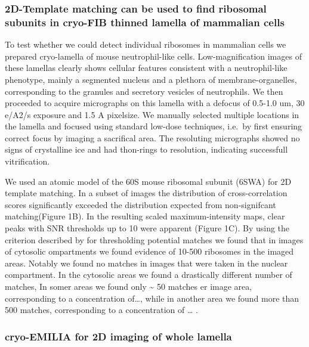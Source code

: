 \documentclass[
]{article}
\begin{document}
\hypertarget{d-template-matching-can-be-used-to-find-ribosomal-subunits-in-cryo-fib-thinned-lamella-of-mammalian-cells}{%
\subsubsection{2D-Template matching can be used to find ribosomal subunits in cryo-FIB thinned lamella of mammalian cells}\label{d-template-matching-can-be-used-to-find-ribosomal-subunits-in-cryo-fib-thinned-lamella-of-mammalian-cells}}

To test whether we could detect individual ribosomes in mammalian cells we
prepared cryo-lamella of mouse neutrophil-like cells. Low-magnification images
of these lamellas clearly shows cellular features consistent with a
neutrophil-like phenotype, mainly a segmented nucleus and a plethora of
membrane-organelles, corresponding to the granules and secretory vesicles of
neutrophils. We then proceeded to acquire micrographs on this lamella with a
defocus of 0.5-1.0 um, 30 e/A2/s exposure and 1.5 A pixelsize. We manually
selected multiple locations in the lamella and focused using standard low-dose
techniques, i.e.~by first ensuring correct focus by imaging a sacrifical area.
The resoluting micrographs showed no signs of crystalline ice and had thon-rings
to resolution, indicating successfull vitrification.

We used an atomic model of the 60S mouse ribosomal subunit (6SWA) for 2D
template matching. In a subset of images the distribution of cross-correlation
scores significantly exceeded the distribution expected from non-signifcant
matching(Figure 1B). In the resulting scaled maximum-intensity maps, clear peaks
with SNR thresholds up to 10 were apparent (Figure 1C). By using the criterion
described by for thresholding potential matches we found that in images of
cytosolic ompartments we found evidence of 10-500 ribosomes in the imaged areas.
Notably we found no matches in images that were taken in the nuclear
compartment. In the cytosolic areas we found a drastically different number of
matches, In somer areas we found only \textasciitilde{} 50 matches er image area, corresponding
to a concentration of\ldots, while in another area we found more than 500 matches,
corresponding to a concentration of \ldots{} .

\hypertarget{cryo-emilia-for-2d-imaging-of-whole-lamella}{%
\subsubsection{cryo-EMILIA for 2D imaging of whole lamella}\label{cryo-emilia-for-2d-imaging-of-whole-lamella}}
\end{document}
